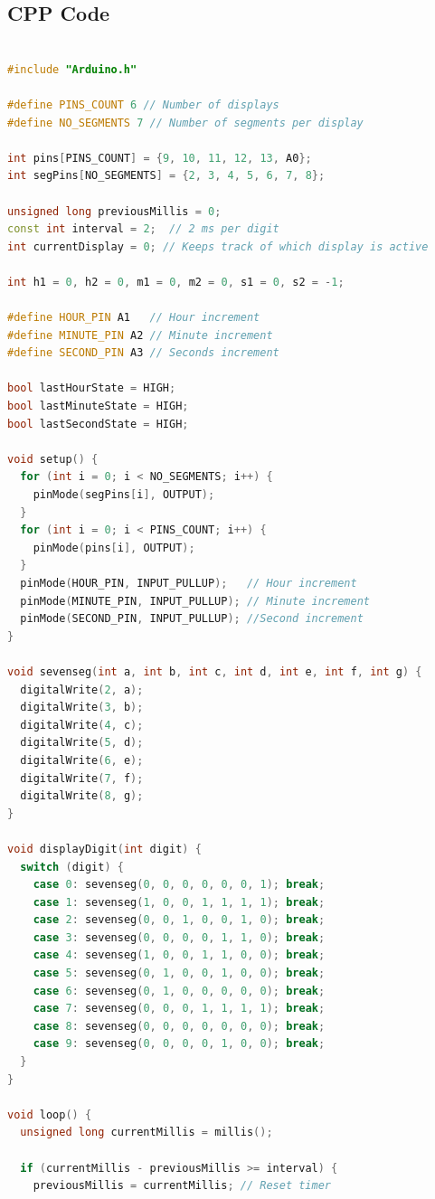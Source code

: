 \documentclass[journal]{IEEEtran}
\begin{document}
\subsection{CPP Code}
\begin{lstlisting}[language=C++]

#include "Arduino.h"

#define PINS_COUNT 6 // Number of displays
#define NO_SEGMENTS 7 // Number of segments per display

int pins[PINS_COUNT] = {9, 10, 11, 12, 13, A0};
int segPins[NO_SEGMENTS] = {2, 3, 4, 5, 6, 7, 8};

unsigned long previousMillis = 0;
const int interval = 2;  // 2 ms per digit
int currentDisplay = 0; // Keeps track of which display is active

int h1 = 0, h2 = 0, m1 = 0, m2 = 0, s1 = 0, s2 = -1;

#define HOUR_PIN A1   // Hour increment
#define MINUTE_PIN A2 // Minute increment
#define SECOND_PIN A3 // Seconds increment 

bool lastHourState = HIGH;
bool lastMinuteState = HIGH;
bool lastSecondState = HIGH;

void setup() {
  for (int i = 0; i < NO_SEGMENTS; i++) {
    pinMode(segPins[i], OUTPUT);
  }
  for (int i = 0; i < PINS_COUNT; i++) {
    pinMode(pins[i], OUTPUT);
  }
  pinMode(HOUR_PIN, INPUT_PULLUP);   // Hour increment
  pinMode(MINUTE_PIN, INPUT_PULLUP); // Minute increment
  pinMode(SECOND_PIN, INPUT_PULLUP); //Second increment
}

void sevenseg(int a, int b, int c, int d, int e, int f, int g) {
  digitalWrite(2, a);
  digitalWrite(3, b);
  digitalWrite(4, c);
  digitalWrite(5, d);
  digitalWrite(6, e);
  digitalWrite(7, f);
  digitalWrite(8, g);
}

void displayDigit(int digit) {
  switch (digit) {
    case 0: sevenseg(0, 0, 0, 0, 0, 0, 1); break;
    case 1: sevenseg(1, 0, 0, 1, 1, 1, 1); break;
    case 2: sevenseg(0, 0, 1, 0, 0, 1, 0); break;
    case 3: sevenseg(0, 0, 0, 0, 1, 1, 0); break;
    case 4: sevenseg(1, 0, 0, 1, 1, 0, 0); break;
    case 5: sevenseg(0, 1, 0, 0, 1, 0, 0); break;
    case 6: sevenseg(0, 1, 0, 0, 0, 0, 0); break;
    case 7: sevenseg(0, 0, 0, 1, 1, 1, 1); break;
    case 8: sevenseg(0, 0, 0, 0, 0, 0, 0); break;
    case 9: sevenseg(0, 0, 0, 0, 1, 0, 0); break;
  }
}

void loop() {
  unsigned long currentMillis = millis();

  if (currentMillis - previousMillis >= interval) {
    previousMillis = currentMillis; // Reset timer
    

\end{lstlisting}
\end{document}
